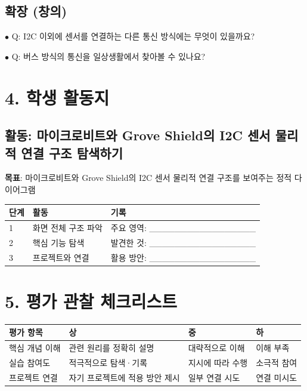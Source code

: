 \documentclass[11pt,a4paper]{article}
\begin{document}
\subsection*{확장 (창의)}

$\bullet$ Q: I2C 이외에 센서를 연결하는 다른 통신 방식에는 무엇이 있을까요?

$\bullet$ Q: 버스 방식의 통신을 일상생활에서 찾아볼 수 있나요?



\section*{4. 학생 활동지}

\subsection*{활동: 마이크로비트와 Grove Shield의 I2C 센서 물리적 연결 구조 탐색하기}

\textbf{목표}: 마이크로비트와 Grove Shield의 I2C 센서 물리적 연결 구조를 보여주는 정적 다이어그램


\begin{center}
\renewcommand{\arraystretch}{1.4}
\begin{tabular}{|p{1.5cm}|p{5.6cm}|p{7.9cm}|}
\hline
\rowcolor{tableheader}
\textbf{단계} & \textbf{활동} & \textbf{기록} \\
\hline
1 & 화면 전체 구조 파악 & 주요 영역: \_\_\_\_\_\_\_\_\_\_\_\_\_\_\_\_\_ \\
\hline
2 & 핵심 기능 탐색 & 발견한 것: \_\_\_\_\_\_\_\_\_\_\_\_\_\_\_\_\_ \\
\hline
3 & 프로젝트와 연결 & 활용 방안: \_\_\_\_\_\_\_\_\_\_\_\_\_\_\_\_\_ \\
\hline
\end{tabular}
\end{center}


\section*{5. 평가 관찰 체크리스트}

\begin{center}
\renewcommand{\arraystretch}{1.4}
\begin{tabular}{|p{3.0cm}|p{6.3cm}|p{3.4cm}|p{2.3cm}|}
\hline
\rowcolor{tableheader}
\textbf{평가 항목} & \textbf{상} & \textbf{중} & \textbf{하} \\
\hline
핵심 개념 이해 & 관련 원리를 정확히 설명 & 대략적으로 이해 & 이해 부족 \\
\hline
실습 참여도 & 적극적으로 탐색·기록 & 지시에 따라 수행 & 소극적 참여 \\
\hline
프로젝트 연결 & 자기 프로젝트에 적용 방안 제시 & 일부 연결 시도 & 연결 미시도 \\
\hline
\end{tabular}
\end{center}
\end{document}
